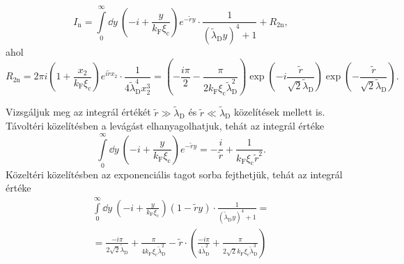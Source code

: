 \documentclass[a4paper,12pt,titlepage]{article}
\newcommand{\kF}{{k_\text{F}}}
\begin{document}
\begin{equation}
	I_\text{n} = \int\limits_0^\infty \dd{y} ~ \left( -i + \frac{y}{\kF \xi_\text{c}} \right) e^{-\tilde{r} y} \cdot \frac{1}{\left( \tilde{\lambda}_\text{D} y \right)^4 + 1} + R_{2 \text{n}},
\end{equation}
ahol
\begin{equation}
	R_{2 \text{n}} = 2 \pi i \left( 1 + \frac{x_2}{\kF \xi_\text{c}} \right) e^{i \tilde{r} x_2} \cdot \frac{1}{4 \tilde{\lambda}_\text{D}^4 x_2^3} = \left( -\frac{i \pi}{2} - \frac{\pi}{2 \kF \xi_\text{c} \tilde{\lambda}_\text{D}^2} \right) \exp(-i \frac{\tilde{r}}{\sqrt{2} \tilde{\lambda}_\text{D}}) \exp(-\frac{\tilde{r}}{\sqrt{2} \tilde{\lambda}_\text{D}}).
\end{equation}

Vizsgáljuk meg az integrál értékét $\tilde{r} \gg \tilde{\lambda}_\text{D}$ és $\tilde{r} \ll \tilde{\lambda}_\text{D}$ közelítések mellett is.  Távoltéri közelítésben a levágást elhanyagolhatjuk, tehát az integrál értéke
\begin{equation} \label{g-n-far-field}
	\int\limits_0^\infty \dd{y} ~ \left( -i + \frac{y}{\kF \xi_\text{c}} \right) e^{-\tilde{r} y} = -\frac{i}{\tilde{r}} + \frac{1}{\kF \xi_\text{c} \tilde{r}^2}.
\end{equation}
Közeltéri közelítésben az exponenciális tagot sorba fejthetjük, tehát az integrál értéke
\begin{multline} \label{g-n-near-field}
	\int\limits_0^\infty \dd{y} ~ \left( -i + \frac{y}{\kF \xi_\text{c}} \right) \left( 1 - \tilde{r} y \right) \cdot \frac{1}{\left( \tilde{\lambda}_\text{D} y \right)^4 + 1} = \\
	= \frac{-i \pi}{2 \sqrt{2} \tilde{\lambda}_\text{D}} + \frac{\pi}{4 \kF \xi_\text{c} \tilde{\lambda}_\text{D}^2} - \tilde{r} \cdot \left( \frac{-i \pi}{4 \tilde{\lambda}_\text{D}^2} + \frac{\pi}{2 \sqrt{2} \kF \xi_\text{c} \tilde{\lambda}_\text{D}^3} \right)
\end{multline}
\end{document}
